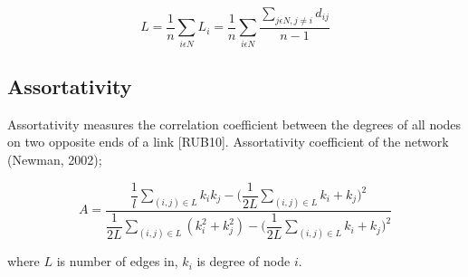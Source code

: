 \documentclass[12pt]{article}
\begin{document}
\begin{equation}
L = \frac{1}{n}\sum\limits_{i \epsilon N} L_i = \frac{1}{n}\sum\limits_{i \epsilon N} \frac{\sum\limits_{j \epsilon N, j \neq i }d_{ij}}{n-1 } 
\end{equation}
%
%
%
%
%
%
%
%
% 
%
%
%
%
%
\subsection{Assortativity}

Assortativity measures the correlation coefficient between the degrees of all nodes on two opposite ends of a link [RUB10]. Assortativity coefficient of the network (Newman, 2002);

\begin{equation}
A = \frac{\dfrac{1}{l} \sum\limits_{(i,j) \in L}  k_i k_j -  \Big ( \dfrac{1}{2L} \sum\limits_{(i,j) \in L}k_i + k_j  \Big )^2}{\dfrac{1}{2L}\sum\limits_{(i,j) \in L} ( k_i^2+  k_j^2) -\Big ( \dfrac{1}{2L} \sum\limits_{(i,j) \in L}k_i + k_j  \Big )^2 }
\end{equation}

where $L$ is number of edges in, $k_i$ is degree of node $i$.
\end{document}
